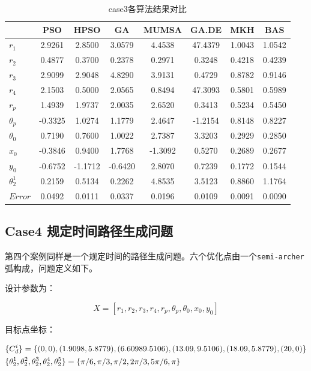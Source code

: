 \documentclass[]{ctexbook}
\begin{document}
\begin{table}[t]

\caption{\label{tab:case3table}case3各算法结果对比}
\centering
\begin{tabular}{lccccccc}
\toprule
  & PSO & HPSO & GA & MUMSA & GA.DE & MKH & BAS\\
\midrule
$r_1$ & 2.9261 & 2.8500 & 3.0579 & 4.4538 & 47.4379 & 1.0043 & 1.0542\\
$r_2$ & 0.4877 & 0.3700 & 0.2378 & 0.2971 & 0.3248 & 0.4218 & 0.4239\\
$r_3$ & 2.9099 & 2.9048 & 4.8290 & 3.9131 & 0.4729 & 0.8782 & 0.9146\\
$r_4$ & 2.1503 & 0.5000 & 2.0565 & 0.8494 & 47.3093 & 0.5801 & 0.5989\\
$r_p$ & 1.4939 & 1.9737 & 2.0035 & 2.6520 & 0.3413 & 0.5234 & 0.5450\\
\addlinespace
$\theta_p$ & -0.3325 & 1.0274 & 1.1779 & 2.4647 & -1.2154 & 0.8148 & 0.8227\\
$\theta_0$ & 0.7190 & 0.7600 & 1.0022 & 2.7387 & 3.3203 & 0.2929 & 0.2850\\
$x_0$ & -0.3846 & 0.9400 & 1.7768 & -1.3092 & 0.5270 & 0.2689 & 0.2677\\
$y_0$ & -0.6752 & -1.1712 & -0.6420 & 2.8070 & 0.7239 & 0.1772 & 0.1544\\
$\theta_2^1$ & 0.2159 & 0.5134 & 0.2262 & 4.8535 & 3.5123 & 0.8860 & 1.1764\\
\addlinespace
$Error$ & 0.0492 & 0.0111 & 0.0337 & 0.0196 & 0.0109 & 0.0091 & 0.0090\\
\bottomrule
\end{tabular}
\end{table}

\subsection{Case4 规定时间路径生成问题}\label{case4-}

第四个案例同样是一个规定时间的路径生成问题。六个优化点由一个\texttt{semi-archer}弧构成，问题定义如下。

设计参数为：

\[
X = [r_1,r_2,r_3,r_4,r_p,\theta_p,\theta_0,x_0,y_0]
\]

目标点坐标：

\begin{align}
&\{C_d^i\} = \{(0,0),(1.9098,5.8779),(6.60989.5106),(13.09,9.5106),(18.09,5.8779),(20,0)\} \notag \\
&\{\theta_2^1,\theta_2^2,\theta_2^3,\theta_2^4,\theta_2^5\}=\{\pi/6,\pi/3,\pi/2,2\pi/3,5\pi/6,\pi\} \notag \\
\end{align}
\end{document}

